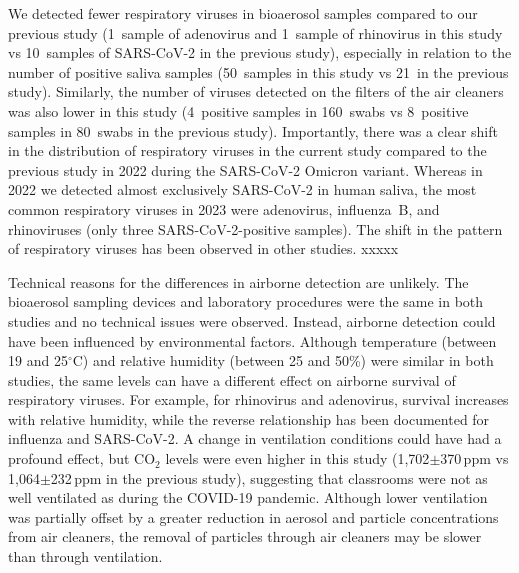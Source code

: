 \documentclass[fleqn,11pt]{wlscirep}
\begin{document}

We detected fewer respiratory viruses in bioaerosol samples compared to our previous study\cite{Banholzer2023PLoSMed} (1~sample of adenovirus and 1~sample of rhinovirus in this study vs 10~samples of SARS-CoV-2 in the previous study), especially in relation to the number of positive saliva samples (50~samples in this study vs 21~in the previous study). Similarly, the number of viruses detected on the filters of the air cleaners was also lower in this study (4~positive samples in 160~swabs vs 8~positive samples in 80~swabs in the previous study). Importantly, there was a clear shift in the distribution of respiratory viruses in the current study compared to the previous study in 2022 during the SARS-CoV-2 Omicron variant. Whereas in 2022 we detected almost exclusively SARS-CoV-2 in human saliva, the most common respiratory viruses in 2023 were adenovirus, influenza~B, and rhinoviruses (only three SARS-CoV-2-positive samples). The shift in the pattern of respiratory viruses has been observed in other studies\cite{Nygaard2023Lancet,Sauteur2022EuroSurv}. xxxxx


Technical reasons for the differences in airborne detection are unlikely. The bioaerosol sampling devices and laboratory procedures were the same in both studies and no technical issues were observed. Instead, airborne detection could have been influenced by environmental factors. Although temperature (between 19 and 25$^{\circ}$C) and relative humidity (between 25 and 50\%) were similar in both studies, the same levels can have a different effect on airborne survival of respiratory viruses. For example, for rhinovirus and adenovirus, survival increases with relative humidity, while the reverse relationship has been documented for influenza and SARS-CoV-2\cite{Tellier2009JTRSI,Ahlawat2020AAQR,Biryukov2020mS,Karim1985CJM,Davis1971AM}. A change in ventilation conditions could have had a profound effect, but CO$_2$ levels were even higher in this study (1,702$\pm$370\,ppm vs 1,064$\pm$232\,ppm in the previous study), suggesting that classrooms were not as well ventilated as during the COVID-19 pandemic. Although lower ventilation was partially offset by a greater reduction in aerosol and particle concentrations from air cleaners, the removal of particles through air cleaners may be slower than through ventilation.

\end{document}
